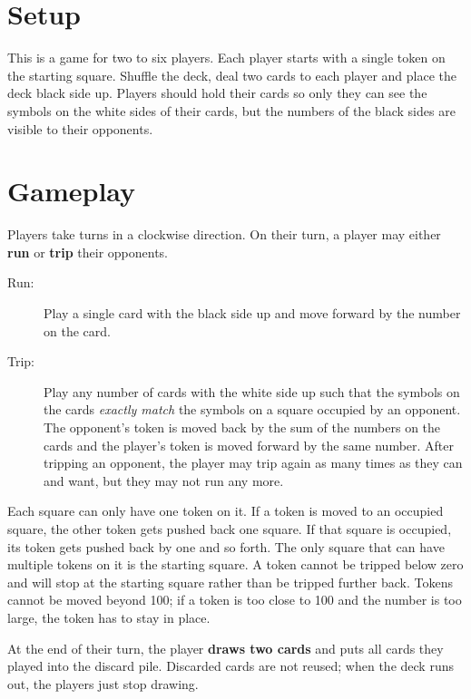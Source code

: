 \documentclass{article}
\begin{document}
\section*{Setup}

This is a game for two to six players. Each player starts with a single token on the starting square. Shuffle the deck, deal two cards to each player and place the deck black side up. Players should hold their cards so only they can see the symbols on the white sides of their cards, but the numbers of the black sides are visible to their opponents.

\section*{Gameplay}

Players take turns in a clockwise direction. On their turn, a player may either \textbf{run} or \textbf{trip} their opponents.

\begin{description}

\item[Run:] Play a single card with the black side up and move forward by the number on the card.

\item[Trip:] Play any number of cards with the white side up such that the symbols on the cards \textit{exactly match} the symbols on a square occupied by an opponent. The opponent's token is moved back by the sum of the numbers on the cards and the player's token is moved forward by the same number. After tripping an opponent, the player may trip again as many times as they can and want, but they may not run any more.

\end{description}

Each square can only have one token on it. If a token is moved to an occupied square, the other token gets pushed back one square. If that square is occupied, its token gets pushed back by one and so forth. The only square that can have multiple tokens on it is the starting square. A token cannot be tripped below zero and will stop at the starting square rather than be tripped further back. Tokens cannot be moved beyond 100; if a token is too close to 100 and the number is too large, the token has to stay in place. 

At the end of their turn, the player \textbf{draws two cards} and puts all cards they played into the discard pile. Discarded cards are not reused; when the deck runs out, the players just stop drawing.
 
\end{document}

